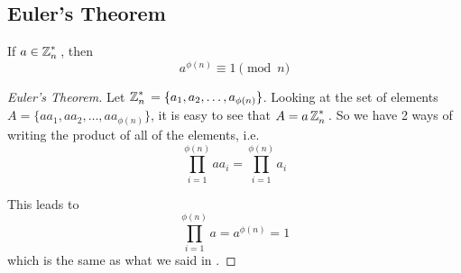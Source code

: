 \subsection{Euler's Theorem}\label{subsec:Eulers_Theorem}
\begin{theorem}\label{thm:Eulers_Theorem}
  If $a \in \operatorname{\mathbb{Z}}_{n}^{*}{}$, then
  \begin{equation}\label{eq:Eulers_Theorem}
    a^{\phi(n)} \equiv 1 \pmod{n}
  \end{equation}
\end{theorem}

\begin{proof}[Euler's Theorem]\label{proof:Eulers_Theorem}
  Let $\operatorname{\mathbb{Z}}_{n}^{*}{} = \lbrace a_{1}, a_{2}, \ldots, a_{\phi(n)} \rbrace$.
  Looking at the set of elements $A = \lbrace aa_{1}, aa_{2}, \ldots, aa_{\phi(n)} \rbrace$, it is easy to see that $A = a \operatorname{\mathbb{Z}}_{n}^{*}{}$.
  So we have 2 ways of writing the product of all of the elements, i.e.
  \begin{equation*}
    \prod\limits_{i=1}^{\phi(n)} a a_{i} = \prod\limits_{i=1}^{\phi(n)} a_{i}
  \end{equation*}
  
  This leads to
  \begin{equation*}
    \prod\limits_{i=1}^{\phi(n)} a = a^{\phi(n)} = 1
  \end{equation*}
  which is the same as what we said in .
\end{proof}

